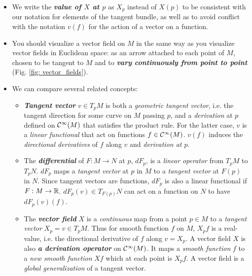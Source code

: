 \documentclass[11pt]{article}
\begin{document}
\begin{itemize}
\item \begin{remark}
We write the \emph{\textbf{value of $X$ at $p$}} as $X_p$ instead of $X(p)$ to be consistent with our notation for elements of the tangent bundle, as well as to avoid conflict with the notation $v(f)$ for the action of a vector on a function.
\end{remark}

\item \begin{remark}
You should visualize a vector field on $M$ in the same way as you visualize vector fields in Euclidean space: as an arrow attached to each point of $M$, chosen to be tangent to $M$ and to \emph{\textbf{vary continuously from point to point}} (Fig. \ref{fig: vector_fields}).
\end{remark}

\item \begin{remark}
We can compare several related concepts:
\begin{itemize}
\item \emph{\textbf{Tangent vector}} $v \in T_{p}M$ is both a \emph{geometric tangent vector}, i.e. the tangent direction for some curve on $M$ passing $p$, and a \emph{derivation} at $p$ defined on ${\mathcal C}^{\infty}(M)$ that satisfies the product rule. For the latter case, $v$ is a \emph{linear functional} that act on functions $f \in {\mathcal C}^{\infty}(M)$.  $v(f)$ induces the \emph{directional derivatives} of $f$ along $v$ and \emph{derivation at $p$}.

\item The \emph{\textbf{differential}} of $F: M\rightarrow N$ at $p$, $dF_{p}$, is a \emph{linear operator} from $T_{p}M$ to $T_{p}N$. $dF_{p}$ maps a \emph{tangent vector} at $p$ in $M$ to a \emph{tangent vector} at $F(p)$ in $N$. Since tangent vectors are functions, $dF_{p}$ is also a linear functional if $F: M\rightarrow {\mathbb R}$. $dF_{p}(v) \in T_{F(p)}N$ can act on a function on $N$ to have $dF_{p}(v)(f)$.

\item The \emph{\textbf{vector field}} $X$ is a \emph{continuous} map from a point $p \in M$ to a \emph{tangent vector} $X_p = v \in T_{p}M$. Thus for smooth function $f$ on $M$, $X_{p}f$ is a real-value, i.e. the directional derivative of $f$ along $v=X_{p}$.   A vector field $X$ is also  \emph{\textbf{a derivation operator}} on ${\mathcal C}^{\infty}(M)$. It maps a \emph{smooth function} $f$ to a \emph{new smooth function} $Xf$ which at each point is $X_{p}f$. A vector field is a \emph{global generalization} of a tangent vector. 
\end{itemize}
\end{remark}


\end{itemize}
\end{document}
